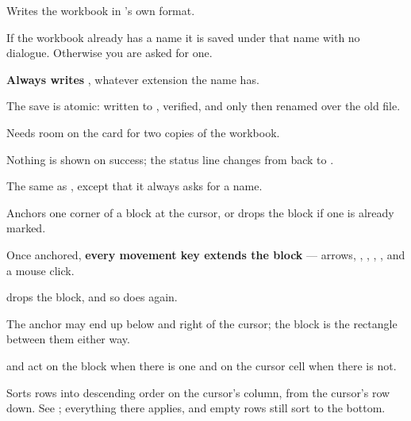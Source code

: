 
Writes the workbook in \ccprod's own  format.

\begin{ccsteps}
\item If the workbook already has a name it is saved under that name with no
dialogue. Otherwise you are asked for one.
\item \textbf{Always writes }, whatever extension the name has.
\item The save is atomic: written to , verified, and only
then renamed over the old file.
\item Needs room on the card for two copies of the workbook.
\item Nothing is shown on success; the status line changes from 
back to .
\end{ccsteps}


The same as , except that it always asks for a name.


Anchors one corner of a block at the cursor, or drops the block if one is
already marked.

\begin{ccsteps}
\item Once anchored, \textbf{every movement key extends the block} --- arrows,
, , , , and a mouse click.
\item {} drops the block, and so does  again.
\item The anchor may end up below and right of the cursor; the block is the
rectangle between them either way.
\item {} and  act on the block when there is one
and on the cursor cell when there is not.
\end{ccsteps}


Sorts rows into descending order on the cursor's column, from the cursor's row
down. See ; everything there applies, and empty rows still
sort to the bottom.

